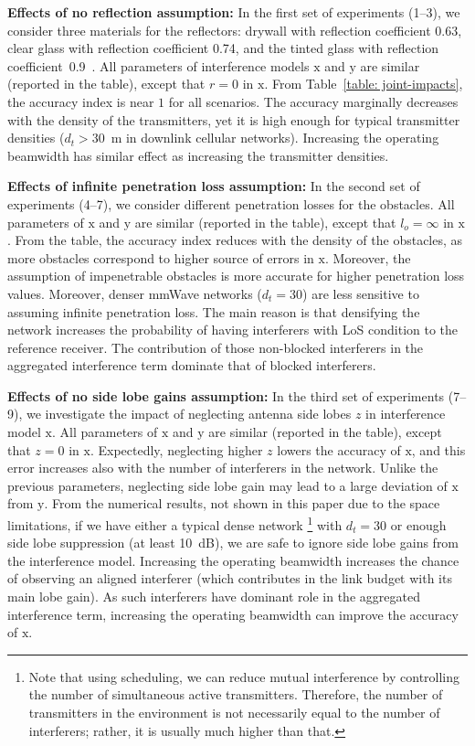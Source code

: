 \documentclass[12pt, draftclsnofoot, onecolumn]{IEEEtran}
\begin{document}
\textbf{Effects of no reflection assumption:} In the first set of experiments (1--3), we consider three materials for the reflectors: drywall with reflection coefficient 0.63, clear glass with reflection coefficient 0.74, and the tinted glass with reflection coefficient~0.9~\cite{Zhao201328Ghz}. All parameters of interference models $\mathrm{x}$ and $\mathrm{y}$ are similar (reported in the table), except that $r = 0$ in $\mathrm{x}$. From Table~\ref{table: joint-impacts}, the accuracy index is near $1$ for all scenarios. The accuracy marginally decreases with the density of the transmitters, yet it is high enough for typical transmitter densities ($d_t > 30$~m in downlink cellular networks). Increasing the operating beamwidth has similar effect as increasing the transmitter densities.



\textbf{Effects of infinite penetration loss assumption:}  In the second set of experiments (4--7), we consider different penetration losses for the obstacles. All parameters of $\mathrm{x}$ and $\mathrm{y}$ are similar (reported in the table), except that $l_o = \infty$ in $\mathrm{x}$. From the table, the accuracy index reduces with the density of the obstacles, as more obstacles correspond to higher source of errors in $\mathrm{x}$. Moreover, the assumption of impenetrable obstacles is more accurate for higher penetration loss values. Moreover, denser mmWave networks ($d_t = 30$) are less sensitive to assuming infinite penetration loss. The main reason is that densifying the network increases the probability of having interferers with LoS condition to the reference receiver. The contribution of those non-blocked interferers in the aggregated interference term dominate that of blocked interferers.


\textbf{Effects of no side lobe gains assumption:} In the third set of experiments (7--9), we investigate the impact of neglecting antenna side lobes $z$ in interference model $\mathrm{x}$. All parameters of $\mathrm{x}$ and $\mathrm{y}$ are similar (reported in the table), except that $z = 0$ in $\mathrm{x}$. Expectedly, neglecting higher $z$ lowers the accuracy of $\mathrm{x}$, and this error increases also with the number of interferers in the network. Unlike the previous parameters, neglecting side lobe gain may lead to a large deviation of $\mathrm{x}$ from $\mathrm{y}$. From the numerical results, not shown in this paper due to the space limitations, if we have either a typical dense network \footnote{Note that using scheduling, we can reduce mutual interference by controlling the number of simultaneous active transmitters. Therefore, the number of transmitters in the environment is not necessarily equal to the number of interferers; rather, it is usually much higher than that.} with $d_t = 30$ or enough side lobe suppression (at least 10~dB), we are safe to ignore side lobe gains from the interference model. Increasing the operating beamwidth increases the chance of observing an aligned interferer (which contributes in the link budget with its main lobe gain). As such interferers have dominant role in the aggregated interference term, increasing the operating beamwidth can improve the accuracy of $\mathrm{x}$.
\end{document}
